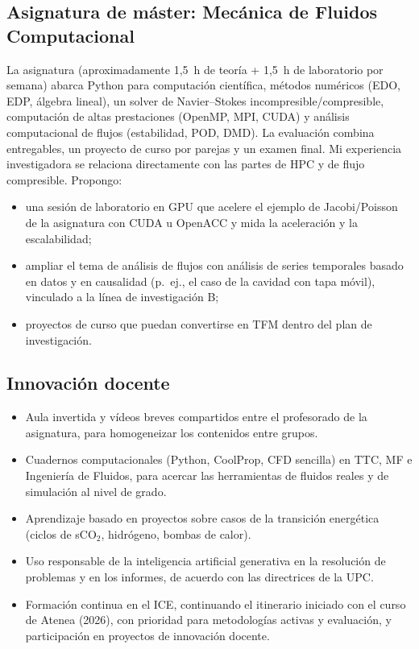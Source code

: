 \documentclass[11pt]{article}
\begin{document}
\subsection{Asignatura de máster: Mecánica de Fluidos Computacional}\label{sec:cfm}
La asignatura (aproximadamente 1,5~h de teoría + 1,5~h de laboratorio por semana) abarca
Python para computación científica, métodos numéricos (EDO, EDP, álgebra lineal), un solver
de Navier--Stokes incompresible/compresible, computación de altas prestaciones (OpenMP, MPI,
CUDA) y análisis computacional de flujos (estabilidad, POD, DMD). La evaluación combina
entregables, un proyecto de curso por parejas y un examen final. Mi experiencia
investigadora se relaciona directamente con las partes de HPC y de flujo compresible.
Propongo:
\begin{itemize}
\item una sesión de laboratorio en GPU que acelere el ejemplo de Jacobi/Poisson de la
asignatura con CUDA u OpenACC y mida la aceleración y la escalabilidad;
\item ampliar el tema de análisis de flujos con análisis de series temporales basado en
datos y en causalidad (p.~ej., el caso de la cavidad con tapa móvil), vinculado a la línea de
investigación B;
\item proyectos de curso que puedan convertirse en TFM dentro del plan de investigación.
\end{itemize}

\subsection{Innovación docente}
\begin{itemize}
\item Aula invertida y vídeos breves compartidos entre el profesorado de la asignatura, para
homogeneizar los contenidos entre grupos.
\item Cuadernos computacionales (Python, CoolProp, CFD sencilla) en TTC, MF e Ingeniería de
Fluidos, para acercar las herramientas de fluidos reales y de simulación al nivel de grado.
\item Aprendizaje basado en proyectos sobre casos de la transición energética (ciclos de
sCO$_2$, hidrógeno, bombas de calor).
\item Uso responsable de la inteligencia artificial generativa en la resolución de problemas
y en los informes, de acuerdo con las directrices de la UPC.
\item Formación continua en el ICE, continuando el itinerario iniciado con el curso de Atenea (2026), con prioridad para metodologías activas y evaluación, y participación en proyectos de
innovación docente.
\end{itemize}
\end{document}
